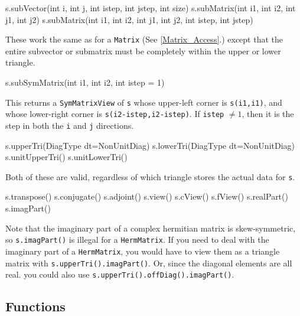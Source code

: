 \documentclass[twoside,letterpaper,11pt]{article}
\renewcommand{\tt}[1]{{\lstinline {#1}}}
\begin{document}
\begin{tmvcode}
s.subVector(int i, int j, int istep, int jstep, int size)
s.subMatrix(int i1, int i2, int j1, int j2)
s.subMatrix(int i1, int i2, int j1, int j2, int istep, int jstep)
\end{tmvcode}
These work the same as for a \tt{Matrix}
(See \ref{Matrix_Access}.)
except that the entire
subvector or submatrix must be completely within the upper or lower triangle.

\begin{tmvcode}
s.subSymMatrix(int i1, int i2, int istep = 1)
\end{tmvcode}
This returns a \tt{SymMatrixView} of \tt{s} whose upper-left
corner is \tt{s(i1,i1)}, and whose lower-right corner is 
\tt{s(i2-istep,i2-istep)}.  If \tt{istep} $\neq 1$, then it is the 
step in both the \tt{i} and \tt{j} directions.

\begin{tmvcode}
s.upperTri(DiagType dt=NonUnitDiag)
s.lowerTri(DiagType dt=NonUnitDiag)
s.unitUpperTri()
s.unitLowerTri()
\end{tmvcode}
Both of these are valid, regardless
of which triangle stores the actual data for \tt{s}.
\begin{tmvcode}
s.transpose()
s.conjugate()
s.adjoint()
s.view()
s.cView()
s.fView()
s.realPart()
s.imagPart()
\end{tmvcode}
Note that the imaginary part of a complex hermitian matrix is skew-symmetric,
so \tt{s.imagPart()} is illegal for a \tt{HermMatrix}.  If you need to
deal with the imaginary part of a \tt{HermMatrix},
you would have to view them as a triangle matrix with \tt{s.upperTri().imagPart()}.  Or, 
since the diagonal elements are all real.
you could also use \tt{s.upperTri().offDiag().imagPart()}. 
\vspace{12pt}

\subsection{Functions}
\label{SymMatrix_Functions}
\end{document}
